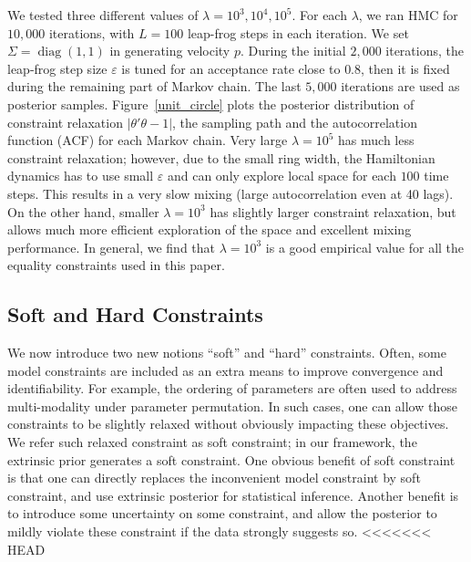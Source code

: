 \documentclass[10pt]{article}
\newcommand{\leo}[1]{{\color{blue}{\it leo: #1}}}
\DeclareMathOperator{\diag}{diag}
\DeclareMathOperator{\1}{\mathbbm{1}}
\begin{document}
We tested three different values of $\lambda = 10^3,10^4,10^5$. For each $\lambda$, we ran HMC for $10,000$ iterations, with $L=100$ leap-frog steps in each iteration. 
We set $\Sigma= \diag(1,1)$ in generating velocity $p$. During the initial $2,000$ iterations, the leap-frog step size $\varepsilon$ is tuned for an acceptance rate close to $0.8$, then it is fixed during the remaining part of Markov chain. The last $5,000$ iterations are used as posterior samples. Figure~\ref{unit_circle} plots the posterior distribution of constraint relaxation $|\theta'\theta -1|$, the sampling path and the autocorrelation function (ACF) for each Markov chain. Very large $\lambda=10^5$ has much less constraint relaxation; however, due to the small ring width, the Hamiltonian dynamics has to use small $\varepsilon$ and can only explore local space for each $100$ time steps. This results in a very slow mixing (large autocorrelation even at 40 lags). On the other hand, smaller $\lambda=10^3$ has slightly larger constraint relaxation, but allows much more efficient exploration of the space and excellent mixing performance. In general, we find that $\lambda=10^3$ is a good empirical value for all the equality constraints used in this paper.

\subsection{Soft and Hard Constraints}

We now introduce two new notions ``soft'' and ``hard'' constraints. Often, some model constraints are included as an extra means to improve convergence and identifiability. For example, the ordering of parameters are often used to address multi-modality under parameter permutation. In such cases, one can allow those constraints to be slightly relaxed without obviously impacting these objectives. We refer such relaxed constraint as soft constraint; in our framework, the extrinsic prior generates a soft constraint. One obvious benefit of soft constraint is that one can directly replaces the inconvenient model constraint by soft constraint, and use extrinsic posterior for statistical inference. Another benefit is to introduce some uncertainty on some constraint, and  allow the posterior to mildly violate these constraint if the data strongly suggests so.
<<<<<<< HEAD

\end{document}
